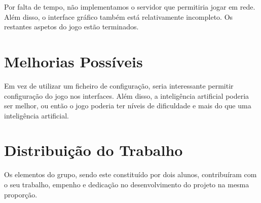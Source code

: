 \documentclass[12pt,a4paper,reqno]{report}
\numberwithin{equation}{section}
\begin{document}
	Por falta de tempo, não implementamos o servidor que permitiria jogar em rede. Além disso, o interface gráfico também está relativamente incompleto. Os restantes aspetos do jogo estão terminados.

\section{Melhorias Possíveis}

	Em vez de utilizar um ficheiro de configuração, seria interessante permitir configuração do jogo nos interfaces. Além disso, a inteligência artificial poderia ser melhor, ou então o jogo poderia ter níveis de dificuldade e mais do que uma inteligência artificial.

\section{Distribuição do Trabalho}
	
	Os elementos do grupo, sendo este constituído por dois alunos, contribuíram com o seu trabalho, empenho e dedicação no desenvolvimento do projeto na mesma proporção.
\end{document}
